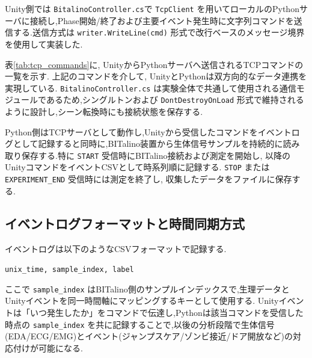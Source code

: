 \documentclass[book,paper=a4,fontsize=10pt,jafontscale=0.92]{jlreq}
\begin{document}
Unity側では \texttt{BitalinoController.cs}で \texttt{TcpClient} を用いてローカルのPythonサーバに接続し,Phase開始/終了および主要イベント発生時に文字列コマンドを送信する.送信方式は \texttt{writer.WriteLine(cmd)} 形式で改行ベースのメッセージ境界を使用して実装した.

表\ref{tab:tcp_commands}に, UnityからPythonサーバへ送信されるTCPコマンドの一覧を示す.
上記のコマンドを介して, UnityとPythonは双方向的なデータ連携を実現している. 
\texttt{BitalinoController.cs} は実験全体で共通して使用される通信モジュールであるため,シングルトンおよび \texttt{DontDestroyOnLoad} 形式で維持されるように設計し,シーン転換時にも接続状態を保存する.

Python側はTCPサーバとして動作し,Unityから受信したコマンドをイベントログとして記録すると同時に,BITalino装置から生体信号サンプルを持続的に読み取り保存する.特に \texttt{START} 受信時にBITalino接続および測定を開始し, 以降のUnityコマンドをイベントCSVとして時系列順に記録する. \texttt{STOP} または \texttt{EXPERIMENT\_END} 受信時には測定を終了し, 収集したデータをファイルに保存する.

\subsection{イベントログフォーマットと時間同期方式}
イベントログは以下のようなCSVフォーマットで記録する.
\begin{center}
\texttt{unix\_time, sample\_index, label}
\end{center}
ここで \texttt{sample\_index} はBITalino側のサンプルインデックスで,生理データとUnityイベントを同一時間軸にマッピングするキーとして使用する.
Unityイベントは「いつ発生したか」をコマンドで伝達し,Pythonは該当コマンドを受信した時点の \texttt{sample\_index} を共に記録することで,以後の分析段階で生体信号(EDA/ECG/EMG)とイベント(ジャンプスケア/ゾンビ接近/ドア開放など)の対応付けが可能になる.
\end{document}
